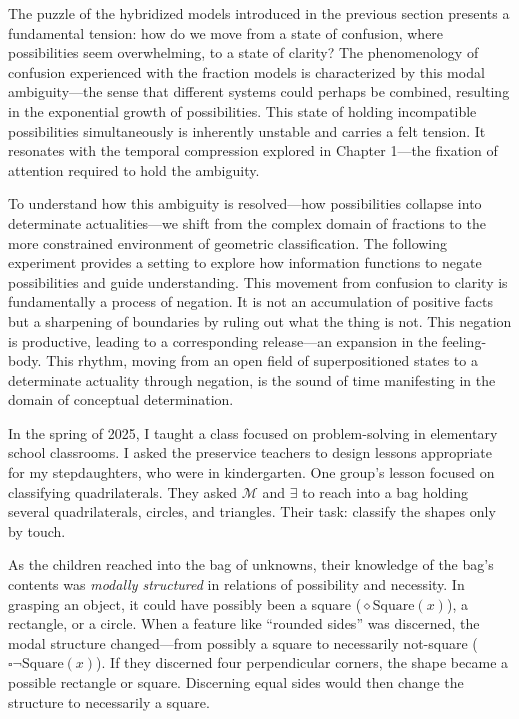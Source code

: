 \documentclass[12pt]{book}
\begin{document}
The puzzle of the hybridized models introduced in the previous section presents a fundamental tension: how do we move from a state of confusion, where possibilities seem overwhelming, to a state of clarity? The phenomenology of confusion experienced with the fraction models is characterized by this modal ambiguity---the sense that different systems could perhaps be combined, resulting in the exponential growth of possibilities. This state of holding incompatible possibilities simultaneously is inherently unstable and carries a felt tension. It resonates with the temporal compression explored in Chapter 1---the fixation of attention required to hold the ambiguity.

To understand how this ambiguity is resolved---how possibilities collapse into determinate actualities---we shift from the complex domain of fractions to the more constrained environment of geometric classification. The following experiment provides a setting to explore how information functions to negate possibilities and guide understanding. This movement from confusion to clarity is fundamentally a process of negation. It is not an accumulation of positive facts but a sharpening of boundaries by ruling out what the thing is not. This negation is productive, leading to a corresponding release---an expansion in the feeling-body. This rhythm, moving from an open field of superpositioned states to a determinate actuality through negation, is the sound of time manifesting in the domain of conceptual determination.

In the spring of 2025, I taught a class focused on problem-solving in elementary school classrooms. I asked the preservice teachers to design lessons appropriate for my stepdaughters, who were in kindergarten. One group's lesson focused on classifying quadrilaterals. They asked \(\mathcal{M}\) and \(\exists\) to reach into a bag holding several quadrilaterals, circles, and triangles. Their task: classify the shapes only by touch.

As the children reached into the bag of unknowns, their knowledge of the bag's contents was \emph{modally structured} in relations of possibility and necessity. In grasping an object, it could have possibly been a square (\(\diamond\text{Square}(x)\)), a rectangle, or a circle. When a feature like ``rounded sides'' was discerned, the modal structure changed---from possibly a square to necessarily not-square (\(\square\neg\text{Square}(x)\)). If they discerned four perpendicular corners, the shape became a possible rectangle or square. Discerning equal sides would then change the structure to necessarily a square.
\end{document}

